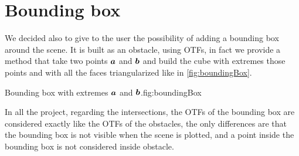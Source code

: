 \documentclass[dissertation.tex]{subfiles}
\begin{document}
\section{Bounding box}
We decided also to give to the user the possibility of adding a
bounding box around the scene. It is built as an obstacle, using
\acp{OTF}, in fact we provide a method that take two points $\boldsymbol{a}$
and $\boldsymbol{b}$ and build the cube with extremes those points and with
all the faces triangularized like in \cref{fig:boundingBox}.
\begin{myfig}{Bounding box with extremes $\boldsymbol{a}$ and $\boldsymbol{b}$.}{fig:boundingBox}
\end{myfig}

In all the project, regarding the intersections, the \acp{OTF} of the
bounding box are considered
exactly like the \acp{OTF} of the obstacles, the only differences are
that the bounding box is not visible when the scene is plotted, and a
point inside the bounding box is not considered inside obstacle.
\end{document}
